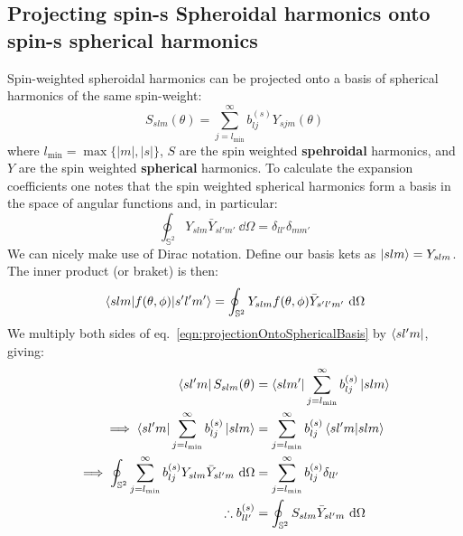 \documentclass[preprint,showpacs,preprintnumbers,amssymb,superscriptaddress,aps,prd,nofootinbib,11pt]{revtex4-1}
\begin{document}
\subsection{Projecting spin-s Spheroidal harmonics onto spin-s spherical harmonics}
Spin-weighted spheroidal harmonics can be projected onto a basis of spherical harmonics of the same spin-weight:
\begin{equation}
    S_{slm}(\theta) = \sum\limits_{j=l_\text{min}}^{\infty} b_{lj}^{(s)} Y_{sjm} (\theta) \label{eqn:projectionOntoSphericalBasis}
\end{equation}
where $l_\text{min} = \max\{|m| ,|s|\}$, $S$ are the spin weighted \textbf{spehroidal} harmonics, and $Y$  are the spin weighted \textbf{spherical} harmonics. To calculate the expansion coefficients one notes that the spin weighted spherical harmonics form a basis in the space of angular functions and, in particular:
\begin{equation}
    \oint_{\mathbb{S}^2} Y_{slm}  \bar{Y}_{s l'  m'} \ \dd \Omega = \delta_{l l'} \delta_{m m'}
\end{equation}
We can nicely make use of Dirac notation. Define our basis kets as $\ket{slm} = Y_{slm}$. The inner product (or braket) is then:
\begin{equation}
    \mel{slm}{f(\theta,\phi)}{s'l'm'}= \oint_{\mathbb{S}^2} Y_{slm} f(\theta,\phi)  \bar{Y}_{s' l'  m'}\  \dd \Omega
\end{equation}
We multiply both sides of eq.~\eqref{eqn:projectionOntoSphericalBasis} by $\bra{sl'm}$, giving:
\begin{align}
    \bra{sl'm} S_{slm}(\theta) &= \bra{slm'}\sum\limits_{j=l_\text{min}}^{\infty} b_{lj}^{(s)} \ket{slm} \\
    \implies \bra{sl'm}\sum\limits_{j=l_\text{min}}^{\infty} b_{lj}^{(s)} \ket{slm} &=\sum\limits_{j=l_\text{min}}^{\infty} b_{lj}^{(s)} \braket{sl'm}{slm}\\
    \implies \oint_{\mathbb{S}^2}  \sum\limits_{j=l_\text{min}}^{\infty} b_{lj}^{(s)} Y_{slm} \bar{Y}_{s l'm} \ \dd \Omega &= \sum\limits_{j=l_\text{min}}^{\infty} b_{lj}^{(s)} \delta_{ll'}\\
    \therefore b_{ll'}^{(s)} &= \oint_{\mathbb{S}^2} S_{slm} \bar{Y}_{sl'm} \ \dd \Omega 
\end{align}
\end{document}
